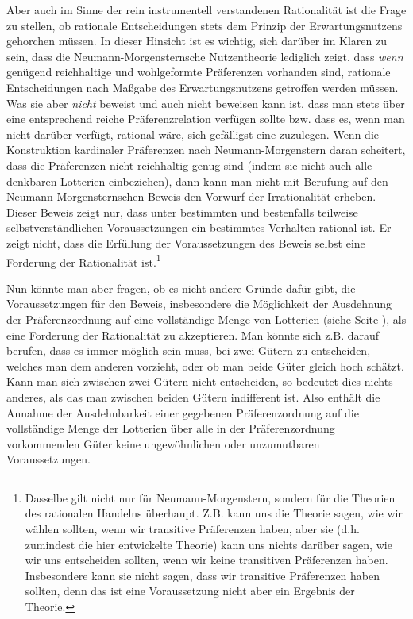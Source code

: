 Aber auch im Sinne der rein instrumentell verstandenen Rationalität ist die Frage
zu stellen, ob rationale Entscheidungen stets dem Prinzip der Erwartungsnutzens
gehorchen müssen. In dieser Hinsicht ist es wichtig, sich darüber im Klaren zu
sein, dass die Neumann-Morgensternsche Nutzentheorie lediglich zeigt, dass {\em
wenn} genügend reichhaltige und wohlgeformte Präferenzen vorhanden sind,
rationale Entscheidungen nach Maßgabe des Erwartungsnutzens getroffen werden
müssen. Was sie aber {\em nicht} beweist  und auch nicht beweisen kann ist, dass man stets über eine
entsprechend reiche Präferenzrelation verfügen sollte bzw. dass es, wenn man
nicht darüber verfügt, rational wäre, sich gefälligst eine zuzulegen. Wenn die
Konstruktion kardinaler Präferenzen nach Neumann-Morgenstern daran scheitert,
dass die Präferenzen nicht reichhaltig genug sind (indem sie nicht auch alle
denkbaren Lotterien einbeziehen), dann kann man nicht mit Berufung auf den
Neumann-Morgensternschen Beweis den Vorwurf der Irrationalität erheben. Dieser
Beweis zeigt nur, dass unter bestimmten und bestenfalls teilweise
selbstverständlichen Voraussetzungen ein bestimmtes Verhalten rational ist. Er
zeigt nicht, dass die Erfüllung der Voraussetzungen des Beweis selbst eine
Forderung der Rationalität ist.\footnote{Dasselbe gilt nicht nur für
Neumann-Morgenstern, sondern für die Theorien des rationalen Handelns
überhaupt. Z.B. kann uns die Theorie sagen, wie wir wählen sollten, wenn wir
transitive Präferenzen haben, aber sie (d.h. zumindest die hier entwickelte
Theorie) kann uns nichts darüber sagen, wie wir uns entscheiden sollten, wenn
wir keine transitiven Präferenzen haben. Insbesondere kann sie nicht sagen,
dass wir transitive Präferenzen haben sollten, denn das ist eine Voraussetzung
nicht aber ein Ergebnis der Theorie.}

Nun könnte man aber fragen, ob es nicht andere Gründe dafür gibt, die
Voraussetzungen für den Beweis, insbesondere die Möglichkeit der Ausdehnung der
Präferenzordnung auf eine vollständige Menge von Lotterien (siehe Seite
\pageref{MengeVonLotterien}), als eine Forderung der Rationalität zu
akzeptieren. Man könnte sich z.B. darauf berufen, dass es immer möglich sein
muss, bei zwei Gütern zu entscheiden, welches man dem anderen vorzieht,
oder ob man beide Güter gleich hoch schätzt. Kann man sich zwischen zwei Gütern
nicht entscheiden, so bedeutet dies nichts anderes, als das man zwischen beiden
Gütern indifferent ist. Also enthält die Annahme der Ausdehnbarkeit einer
gegebenen Präferenzordnung auf die vollständige Menge der Lotterien über alle
in der Präferenzordnung vorkommenden Güter keine ungewöhnlichen oder
unzumutbaren Voraussetzungen.

